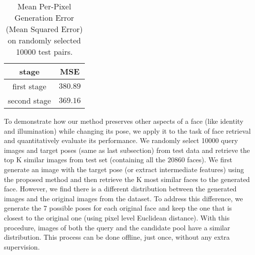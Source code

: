 \documentclass[10pt,twocolumn,letterpaper]{article}
\begin{document}
\begin{table}
\begin{center}{\small
{
\begin{tabular}{|c|c|}
\hline
stage & MSE \\
\hline\hline
{first stage}	&	$380.89$ \\
{second stage}	&	$369.16$ \\
\hline
\end{tabular}
}
}
\end{center}
\caption{Mean Per-Pixel Generation Error (Mean Squared Error) on randomly selected 10000 test pairs.}
\label{table:2stage_MSE_performance}
\end{table}%
To demonstrate how our method preserves other aspects of a face (like identity and illumination) while changing its pose, we apply it to the task of face retrieval and quantitatively evaluate its performance.
We randomly select 10000 query images and target poses (same as last subsection) from test data and retrieve the top K similar images from test set (containing all the $20860$ faces).
We first generate an image with the target pose (or extract intermediate features) using the proposed method and then retrieve the K most similar faces to the generated face. However, we find there is a different distribution between the generated images and the original images from the dataset. To address this difference, we generate the 7 possible poses for each original face and keep the one that is closest to the original one (using pixel level Euclidean distance). With this procedure, images of both the query and the candidate pool have a similar distribution. This process can be done offline, just once, without any extra supervision.
\end{document}
